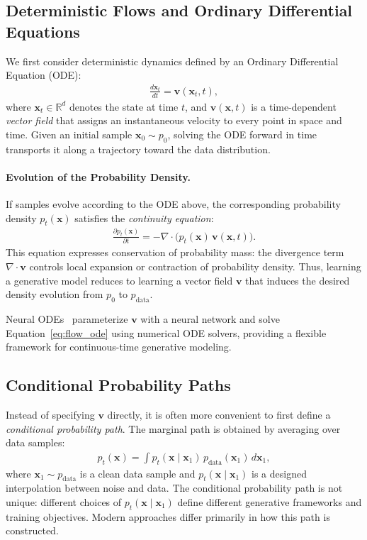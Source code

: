 \subsection{Deterministic Flows and Ordinary Differential Equations}
\label{subsec:ode_flows}

We first consider deterministic dynamics defined by an Ordinary Differential Equation (ODE):
\begin{align}
    \frac{d\mathbf{x}_t}{dt} = \mathbf{v}(\mathbf{x}_t, t),
    \label{eq:flow_ode}
\end{align}
where $\mathbf{x}_t \in \mathbb{R}^d$ denotes the state at time $t$, and $\mathbf{v}(\mathbf{x}, t)$ is a time-dependent \emph{vector field} that assigns an instantaneous velocity to every point in space and time. Given an initial sample $\mathbf{x}_0 \sim p_0$, solving the ODE forward in time transports it along a trajectory toward the data distribution.

\paragraph{Evolution of the Probability Density.}
If samples evolve according to the ODE above, the corresponding probability density $p_t(\mathbf{x})$ satisfies the \emph{continuity equation}:
\begin{align}
    \frac{\partial p_t(\mathbf{x})}{\partial t} = -\nabla \cdot \bigl(p_t(\mathbf{x})\,\mathbf{v}(\mathbf{x}, t)\bigr).
    \label{eq:continuity}
\end{align}
This equation expresses conservation of probability mass: the divergence term $\nabla \cdot \mathbf{v}$ controls local expansion or contraction of probability density. Thus, learning a generative model reduces to learning a vector field $\mathbf{v}$ that induces the desired density evolution from $p_0$ to $p_{\text{data}}$.

Neural ODEs~\cite{chen2018neural} parameterize $\mathbf{v}$ with a neural network and solve Equation~\eqref{eq:flow_ode} using numerical ODE solvers, providing a flexible framework for continuous-time generative modeling.

\subsection{Conditional Probability Paths}
\label{subsec:conditional_paths}

Instead of specifying $\mathbf{v}$ directly, it is often more convenient to first define a \emph{conditional probability path}. The marginal path is obtained by averaging over data samples:
\begin{align}
    p_t(\mathbf{x}) = \int p_t(\mathbf{x} \mid \mathbf{x}_1)\, p_{\text{data}}(\mathbf{x}_1)\, d\mathbf{x}_1,
    \label{eq:marginal_path}
\end{align}
where $\mathbf{x}_1 \sim p_{\text{data}}$ is a clean data sample and $p_t(\mathbf{x} \mid \mathbf{x}_1)$ is a designed interpolation between noise and data. The conditional probability path is not unique: different choices of $p_t(\mathbf{x} \mid \mathbf{x}_1)$ define different generative frameworks and training objectives. Modern approaches differ primarily in how this path is constructed.


